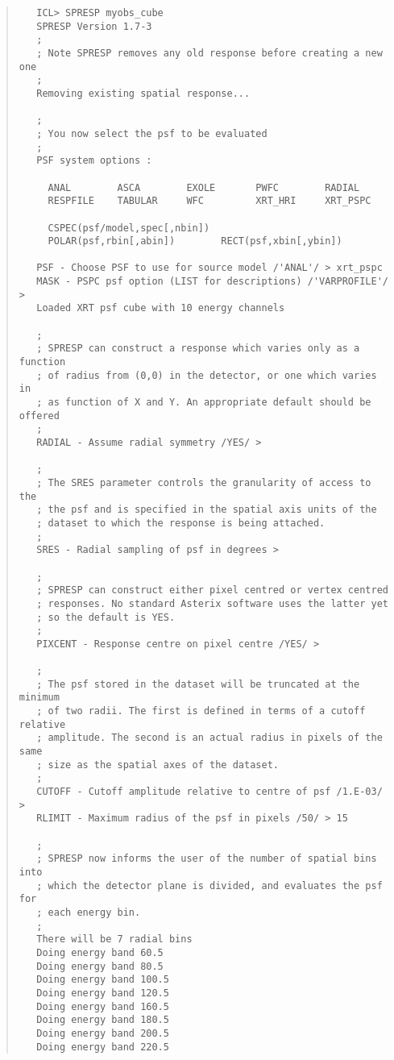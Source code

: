 \documentclass{book}
\renewcommand{\_}{{\tt\char'137}}     %
\begin{document}
\begin{quote}\begin{verbatim}
   ICL> SPRESP myobs_cube
   SPRESP Version 1.7-3
   ;
   ; Note SPRESP removes any old response before creating a new one
   ;
   Removing existing spatial response...

   ;
   ; You now select the psf to be evaluated
   ;
   PSF system options :

     ANAL        ASCA        EXOLE       PWFC        RADIAL
     RESPFILE    TABULAR     WFC         XRT_HRI     XRT_PSPC

     CSPEC(psf/model,spec[,nbin])
     POLAR(psf,rbin[,abin])        RECT(psf,xbin[,ybin])

   PSF - Choose PSF to use for source model /'ANAL'/ > xrt_pspc
   MASK - PSPC psf option (LIST for descriptions) /'VARPROFILE'/ >
   Loaded XRT psf cube with 10 energy channels

   ;
   ; SPRESP can construct a response which varies only as a function
   ; of radius from (0,0) in the detector, or one which varies in
   ; as function of X and Y. An appropriate default should be offered
   ;
   RADIAL - Assume radial symmetry /YES/ >

   ;
   ; The SRES parameter controls the granularity of access to the
   ; the psf and is specified in the spatial axis units of the
   ; dataset to which the response is being attached.
   ;
   SRES - Radial sampling of psf in degrees >

   ;
   ; SPRESP can construct either pixel centred or vertex centred
   ; responses. No standard Asterix software uses the latter yet
   ; so the default is YES.
   ;
   PIXCENT - Response centre on pixel centre /YES/ >

   ;
   ; The psf stored in the dataset will be truncated at the minimum
   ; of two radii. The first is defined in terms of a cutoff relative
   ; amplitude. The second is an actual radius in pixels of the same
   ; size as the spatial axes of the dataset.
   ;
   CUTOFF - Cutoff amplitude relative to centre of psf /1.E-03/ >
   RLIMIT - Maximum radius of the psf in pixels /50/ > 15

   ;
   ; SPRESP now informs the user of the number of spatial bins into
   ; which the detector plane is divided, and evaluates the psf for
   ; each energy bin.
   ;
   There will be 7 radial bins
   Doing energy band 60.5
   Doing energy band 80.5
   Doing energy band 100.5
   Doing energy band 120.5
   Doing energy band 160.5
   Doing energy band 180.5
   Doing energy band 200.5
   Doing energy band 220.5
\end{verbatim}\end{quote}
\end{document}
